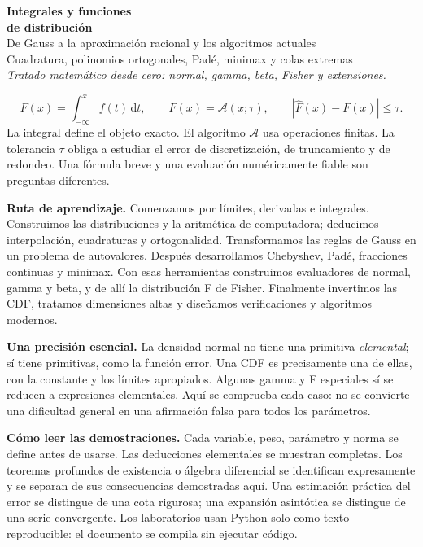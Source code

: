 \documentclass[11pt,a4paper]{article}
\newcommand{\dd}{\,\mathrm d}
\theoremstyle{definition}
\newcounter{problema}
\begin{document}
\begin{center}
{\Huge\bfseries\color{azul}Integrales y funciones\\[3pt]de distribución}\\[7pt]
{\Large De Gauss a la aproximación racional y los algoritmos actuales}\\[5pt]
{\large Cuadratura, polinomios ortogonales, Padé, minimax y colas extremas}\\[5pt]
\textit{Tratado matemático desde cero: normal, gamma, beta, Fisher y extensiones.}
\end{center}
\begin{idea}
\[
F(x)=\int_{-\infty}^x f(t)\dd t,
\qquad \widehat F(x)=\mathcal A(x;\tau),
\qquad |\widehat F(x)-F(x)|\le\tau.
\]
La integral define el objeto exacto. El algoritmo $\mathcal A$ usa operaciones finitas. La tolerancia $\tau$ obliga a estudiar el error de discretización, de truncamiento y de redondeo. Una fórmula breve y una evaluación numéricamente fiable son preguntas diferentes.
\end{idea}
\textbf{Ruta de aprendizaje.} Comenzamos por límites, derivadas e integrales. Construimos las distribuciones y la aritmética de computadora; deducimos interpolación, cuadraturas y ortogonalidad. Transformamos las reglas de Gauss en un problema de autovalores. Después desarrollamos Chebyshev, Padé, fracciones continuas y minimax. Con esas herramientas construimos evaluadores de normal, gamma y beta, y de allí la distribución F de Fisher. Finalmente invertimos las CDF, tratamos dimensiones altas y diseñamos verificaciones y algoritmos modernos.

\textbf{Una precisión esencial.} La densidad normal no tiene una primitiva \emph{elemental}; sí tiene primitivas, como la función error. Una CDF es precisamente una de ellas, con la constante y los límites apropiados. Algunas gamma y F especiales sí se reducen a expresiones elementales. Aquí se comprueba cada caso: no se convierte una dificultad general en una afirmación falsa para todos los parámetros.

\textbf{Cómo leer las demostraciones.} Cada variable, peso, parámetro y norma se define antes de usarse. Las deducciones elementales se muestran completas. Los teoremas profundos de existencia o álgebra diferencial se identifican expresamente y se separan de sus consecuencias demostradas aquí. Una estimación práctica del error se distingue de una cota rigurosa; una expansión asintótica se distingue de una serie convergente. Los laboratorios usan Python solo como texto reproducible: el documento se compila sin ejecutar código.
\end{document}
